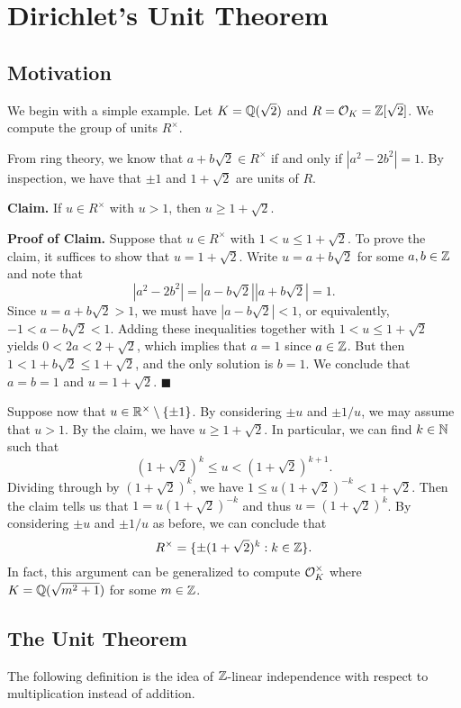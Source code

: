 \section{Dirichlet's Unit Theorem}\label{sec:5}

\subsection{Motivation}\label{subsec:5.1}
We begin with a simple example. Let $K = \mathbb{Q}(\sqrt{2})$ and 
$R = {\cal O}_K = \mathbb{Z}[\sqrt{2}]$. We compute the group of units $R^\times$.

From ring theory, we know that $a + b\sqrt{2} \in R^\times$ if and only if 
$|a^2 - 2b^2| = 1$. By inspection, we have that $\pm 1$ and $1 + \sqrt{2}$ 
are units of $R$.

{\bf Claim.} If $u \in R^\times$ with $u > 1$, then $u \geq 1 + \sqrt{2}$. 

{\bf Proof of Claim.} Suppose that $u \in R^\times$ with $1 < u \leq 1 + \sqrt{2}$. 
To prove the claim, it suffices to show that $u = 1 + \sqrt{2}$. 
Write $u = a + b\sqrt{2}$ for some $a, b \in \mathbb{Z}$ and note that 
\[ |a^2 - 2b^2| = |a - b\sqrt{2}||a + b\sqrt{2}| = 1. \] 
Since $u = a + b\sqrt{2} > 1$, we must have $|a - b\sqrt{2}| < 1$, or 
equivalently, $-1 < a - b\sqrt{2} < 1$. Adding these inequalities together with 
$1 < u \leq 1 + \sqrt{2}$ yields $0 < 2a < 2+\sqrt{2}$,
which implies that $a = 1$ since $a \in \mathbb{Z}$. But then $1 < 1 + b\sqrt{2} 
\leq 1 + \sqrt{2}$, and the only solution is $b = 1$. We conclude that 
$a = b = 1$ and $u = 1 + \sqrt{2}$. \hfill$\blacksquare$

Suppose now that $u \in \mathbb{R}^\times \setminus \{\pm1\}$. By considering 
$\pm u$ and $\pm 1/u$, we may assume that $u > 1$. By the claim, we have 
$u \geq 1 + \sqrt{2}$. In particular, we can find $k \in \mathbb{N}$ such that 
\[ (1 + \sqrt{2})^k \leq u < (1 + \sqrt{2})^{k+1}. \] 
Dividing through by $(1 + \sqrt{2})^k$, we have $1 \leq u(1 + \sqrt{2})^{-k} 
< 1 + \sqrt{2}$. Then the claim tells us that $1 = u(1 + \sqrt{2})^{-k}$ 
and thus $u = (1 + \sqrt{2})^k$. By considering $\pm u$ and $\pm 1/u$ as before, 
we can conclude that 
\[ R^\times = \{\pm(1 + \sqrt{2})^k : k \in \mathbb{Z}\}. \] 
In fact, this argument can be generalized to compute ${\cal O}_K^\times$ 
where $K = \mathbb{Q}(\sqrt{m^2+1})$ for some $m \in \mathbb{Z}$.

\subsection{The Unit Theorem} \label{subsec:5.2}
The following definition is the idea of $\mathbb{Z}$-linear independence 
with respect to multiplication instead of addition. 

